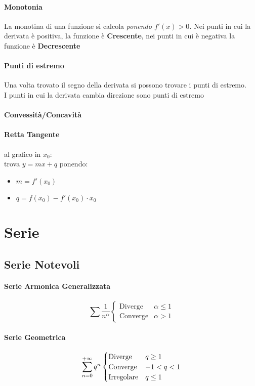 \documentclass[12pt, a4paper, openany]{article}
\begin{document}
\paragraph*{Monotonia}
La monotina di una funzione si calcola \emph{ponendo $f'(x)>0$.}
Nei punti in cui la derivata è positiva, la funzione è \textbf{Crescente}, nei punti in cui è negativa la funzione è \textbf{Decrescente}
\paragraph*{Punti di estremo}
Una volta trovato il segno della derivata si possono trovare i punti di estremo.
\\I punti in cui la derivata cambia direzione sono punti di estremo
\paragraph*{Convessità/Concavità}


\paragraph*{Retta Tangente} al grafico in $x_0$:\\
trova $y=mx + q$ ponendo:
\begin{itemize}
	\item $m=f'(x_0)$
	\item $q=f(x_0)-f'(x_0)\cdot x_0$
\end{itemize}


\section*{Serie}
	\subsection*{Serie Notevoli}
	\paragraph*{Serie Armonica Generalizzata}
	\begin{equation*}
		\sum \frac{1}{n^\alpha} \begin{cases}
			\text{Diverge}  & \alpha\leq 1 \\
			\text{Converge} & \alpha> 1
		\end{cases}
	\end{equation*}
	\paragraph*{Serie Geometrica}
	\begin{equation*}
		\sum_{n=0}^{+\infty} q^n \begin{cases}
			\text{Diverge}    & q\geq 1 \\
			\text{Converge}   & -1<q<1  \\
			\text{Irregolare} & q\leq 1
		\end{cases}
	\end{equation*}
\end{document}
